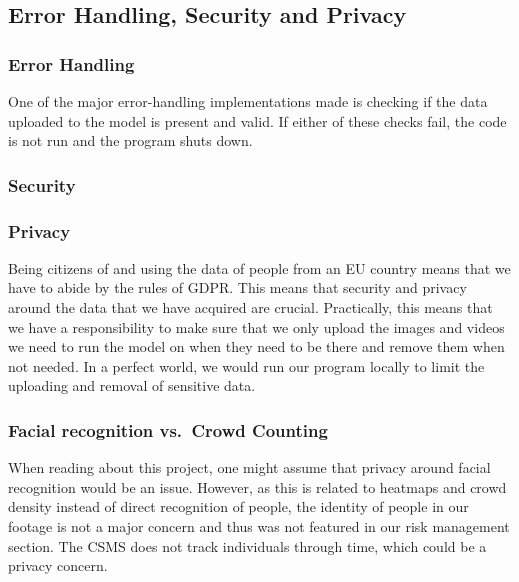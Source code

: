 \documentclass[
]{article}
\begin{document}
\hypertarget{error-handling-security-and-privacy}{%
\subsection{Error Handling, Security and
Privacy}\label{error-handling-security-and-privacy}}

\hypertarget{error-handling}{%
\subsubsection{Error Handling}\label{error-handling}}

One of the major error-handling implementations made is checking if the
data uploaded to the model is present and valid. If either of these
checks fail, the code is not run and the program shuts down.

\hypertarget{security}{%
\subsubsection{Security}\label{security}}

\hypertarget{privacy}{%
\subsubsection{Privacy}\label{privacy}}

Being citizens of and using the data of people from an EU country means
that we have to abide by the rules of GDPR. This means that security and
privacy around the data that we have acquired are crucial. Practically,
this means that we have a responsibility to make sure that we only
upload the images and videos we need to run the model on when they need
to be there and remove them when not needed. In a perfect world, we
would run our program locally to limit the uploading and removal of
sensitive data.

\hypertarget{facial-recognition-vs.-crowd-counting}{%
\subsubsection{Facial recognition vs.~Crowd
Counting}\label{facial-recognition-vs.-crowd-counting}}

When reading about this project, one might assume that privacy around
facial recognition would be an issue. However, as this is related to
heatmaps and crowd density instead of direct recognition of people, the
identity of people in our footage is not a major concern and thus was
not featured in our risk management section. The CSMS does not track
individuals through time, which could be a privacy concern.
\end{document}

